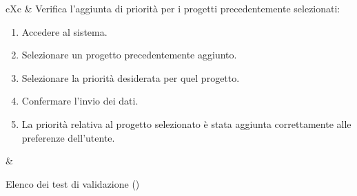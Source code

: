 \begin{table}[H]
\begin{VTtable}[1.7]{\textwidth}{cXc}
        \addtotv & Verifica l'aggiunta di priorità per i progetti precedentemente selezionati:
        \begin{enumerate}
            \item Accedere al sistema.
            \item Selezionare un progetto precedentemente aggiunto.
            \item Selezionare la priorità desiderata per quel progetto.
            \item Confermare l'invio dei dati.
            \item La priorità relativa al progetto selezionato è stata aggiunta correttamente alle preferenze dell'utente.
        \end{enumerate}
        & \TNI \\
        \bottomrule
	\end{VTtable}
	\caption{Elenco dei test di validazione (\thetableCounter)}
\end{table}

